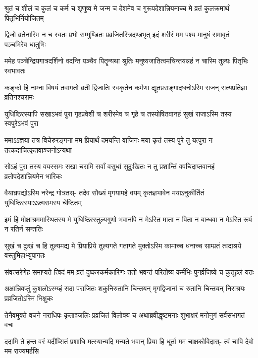 \fourlineindentedshloka
{श्रुतं च शीलं च कुलं च कर्म च}
{शृणुष्व मे जन्म च देशमेव च}
{गुरूपदेशान्नियमाच्च मे व्रतं}
{कुलक्रमार्थं पितृभिर्नियोजितम्}


\fourlineindentedshloka
{द्विजो व्रतेनास्मि न च स्वतः प्रभो}
{सम्मुण्डितः प्रव्रजितस्त्रिदण्डभृत्}
{इदं शरीरं मम पश्य मानुषं}
{समावृतं पञ्चभिरेव धातुभिः}


\fourlineindentedshloka
{ममेह पञ्चेन्द्रियगात्रदर्शिनो}
{वदन्ति पञ्चैव पितॄन्यथा श्रुतिः}
{मनुष्यजातित्वमचिन्तयन्नहं}
{न चास्मि तुल्यः पितृभिः स्वभावतः}


\fourlineindentedshloka
{कङ्को हि नाम्ना विषयं तवागतो}
{व्रती द्विजातिः स्वकृतेन कर्मणा}
{द्यूतप्रसङ्गादधनोऽस्मि राजन्}
{सत्यप्रतिज्ञा व्रतिनश्चरामः}


\fourlineindentedshloka
{युधिष्ठिरस्यापि सखाऽभवं पुरा}
{गृहप्रवेशी च शरीरमेव च}
{गृहे च तस्योषितवानहं सुखं}
{राजाऽस्मि तस्य स्वपुरेऽभवं पुरा}


\fourlineindentedshloka
{ममाऽऽज्ञया तत्र विचेरुरङ्गना}
{मम प्रियार्थं दमयन्ति वाजिनः}
{मया कृतं तस्य पुरे तु यत्पुरा}
{न तत्कदाचित्कृतवाञ्जनोऽन्यथा}


\fourlineindentedshloka
{सोऽहं पुरा तस्य वयस्समः सखा}
{चरामि सर्वां वसुधां सुदुःखितः}
{न तु प्रशान्तिं क्वचिदाप्तवानहं}
{व्रतोपदेशान्नियमेन भारिकः}


\fourlineindentedshloka
{वैयाघ्रपद्योऽस्मि नरेन्द्र गोत्रतस्-}
{तदेव सौख्यं मृगयामहे वयम्}
{कृतज्ञभावेन मयाऽनुकीर्तितं}
{युधिष्ठिरस्याऽऽत्मसमस्य चेष्टितम्}


\fourlineindentedshloka
{इमं हि मोक्षाश्रममास्थितस्य मे}
{युधिष्ठिरस्तुल्यगुणो भवानपि}
{न मेऽस्ति माता न पिता न बान्धवा}
{न मेऽस्ति रूपं न रतिर्न सन्ततिः}


\fourlineindentedshloka
{सुखं च दुःखं च हि तुल्यमद्य मे}
{प्रियाप्रिये तुल्यगते गतागते}
{मुक्तोऽस्मि कामाच्च धनाच्च साम्प्रतं}
{त्वदाश्रये वस्तुमिहाभ्युपागतः}


\fourlineindentedshloka
{संवत्सरेणेह समाप्यते त्विदं}
{मम व्रतं दुष्करकर्मकारिणः}
{ततो भवन्तं परितोष्य कर्मभिः}
{पुनर्व्रजिष्ये च कुतूहलं यतः}


\fourlineindentedshloka
{अक्षान्निवप्तुं कुशलोऽस्म्य्हं सदा}
{पराजितः शकुनिरुतानि चिन्तयन्}
{मृगद्विजानां च रुतानि चिन्तयन्}
{निराश्रयः प्रव्रजितोऽस्मि भिक्षुकः}



\fourlineindentedshloka
{तेनैवमुक्ते वचने नराधिपः}
{कृताञ्जलिः प्रव्रजितं विलोक्य च}
{अथाब्रवीद्धृष्टमनाः शुभाक्षरं}
{मनोनुगं सर्वसभागतं वचः}


\fourlineindentedshloka
{ददामि ते हन्त वरं यदीप्सितं}
{प्रशाधि मत्स्यान्यदि मन्यते भवान्}
{प्रिया हि धूर्ता मम चाक्षकोविदास्-}
{त्वं चापि देवो मम राज्यमर्हसि}


